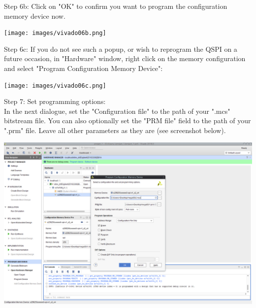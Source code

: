 \begin{minipage}{\linewidth}
  Step 6b: Click on "OK" to confirm you want to program the configuration memory device now.
  \begin{center}
    \texttt{[image: images/vivado06b.png]}
  \end{center}
\end{minipage}

\begin{minipage}{\linewidth}
  Step 6c: If you do not see such a popup, or wish to reprogram the QSPI on a future occasion, in "Hardware" window, right click on the memory configuration and select "Program Configuration Memory Device":
  \begin{center}
    \texttt{[image: images/vivado06c.png]}
  \end{center}
\end{minipage}

\begin{minipage}{\linewidth}
  Step 7: Set programming options: \\
  In the next dialogue, set the "Configuration file" to the path of your ".mcs" bitstream file. You can also optionally set the "PRM file" field to the path of your ".prm" file. Leave all other parameters
  as they are (see screenshot below).
  \\
  \begin{center}
    \includegraphics[width=0.85\linewidth]{images/vivado07.png}
  \end{center}
\end{minipage}

\vspace{1mm}

